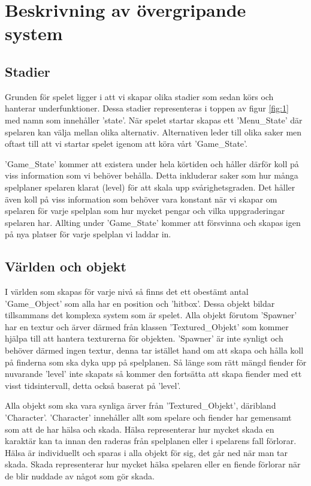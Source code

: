\documentclass{TDP005mall}
\begin{document}
\section{Beskrivning av övergripande system}

\subsection{Stadier}
Grunden för spelet ligger i att vi skapar olika stadier som sedan körs och hanterar underfunktioner. Dessa stadier representeras i toppen av figur \ref{fig:1} med namn som innehåller 'state'. När spelet startar skapas ett 'Menu\_State' där spelaren kan välja mellan olika alternativ. Alternativen leder till olika saker men oftast till att vi startar spelet igenom att köra vårt 'Game\_State'. 

'Game\_State' kommer att existera under hela körtiden och håller därför koll på viss information som vi behöver behålla. Detta inkluderar saker som hur många spelplaner spelaren klarat (level) för att skala upp svårighetsgraden. Det håller även koll på viss information som behöver vara konstant när vi skapar om spelaren för varje spelplan som hur mycket pengar och vilka uppgraderingar spelaren har. Allting under 'Game\_State' kommer att försvinna och skapas igen på nya platser för varje spelplan vi laddar in.

\subsection{Världen och objekt}
I världen som skapas för varje nivå så finns det ett obestämt antal 'Game\_Object' som alla har en position och 'hitbox'. Dessa objekt bildar tillsammans det komplexa system som är spelet. Alla objekt förutom 'Spawner' har en textur och ärver därmed från klassen 'Textured\_Objekt' som kommer hjälpa till att hantera texturerna för objekten. 'Spawner' är inte synligt och behöver därmed ingen textur, denna tar istället hand om att skapa och hålla koll på finderna som ska dyka upp på spelplanen. Så länge som rätt mängd fiender för nuvarande 'level' inte skapats så kommer den fortsätta att skapa fiender med ett visst tidsintervall, detta också baserat på 'level'.

Alla objekt som ska vara synliga ärver från 'Textured\_Objekt', däribland 'Character'. 'Character' innehåller allt som spelare och fiender har gemensamt som att de har hälsa och skada. Hälsa representerar hur mycket skada en karaktär kan ta innan den raderas från spelplanen eller i spelarens fall förlorar. Hälsa är individuellt och sparas i alla objekt för sig, det går ned när man tar skada. Skada representerar hur mycket hälsa spelaren eller en fiende förlorar när de blir nuddade av något som gör skada.
\end{document}
